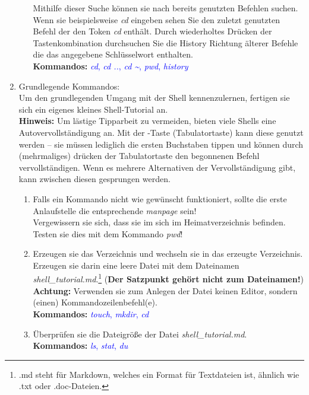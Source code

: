 \documentclass[paper=a4,fontsize=11pt]{scrartcl}%
\numberwithin{equation}{section}
\begin{document}
\begin{enumerate}
\begin{enumerate}[label=(\alph*)]
		Mithilfe dieser Suche können sie nach bereits genutzten Befehlen suchen. Wenn sie beispielsweise \emph{cd} eingeben sehen Sie den zuletzt genutzten Befehl der den Token \emph{cd} enthält. Durch wiederholtes Drücken der Tastenkombination  durchsuchen Sie die History Richtung älterer Befehle die das angegebene Schlüsselwort enthalten.\\
		\textbf{Kommandos:} \textcolor{blue}{\emph{cd}, \emph{cd ..}, \emph{cd \textasciitilde}, \emph{pwd}, \emph{history}}
	\end{enumerate}
	\item Grundlegende Kommandos:\\
  Um den grundlegenden Umgang mit der Shell kennenzulernen, fertigen sie sich ein eigenes kleines Shell-Tutorial an.\\
  \textbf{Hinweis:} Um lästige Tipparbeit zu vermeiden, bieten viele Shells eine Autovervollständigung an. Mit der \keys{\tab}-Taste (Tabulatortaste) kann diese genutzt werden -- sie müssen lediglich die ersten Buchstaben tippen und können durch (mehrmaliges) drücken der Tabulatortaste den begonnenen Befehl vervollständigen. Wenn es mehrere Alternativen der Vervollständigung gibt, kann zwischen diesen gesprungen werden.\\
  	\begin{enumerate}[label=(\alph*)]
  		\item Falls ein Kommando nicht wie gewünscht funktioniert, sollte die erste Anlaufstelle die entsprechende \emph{manpage} sein!\\
  		Vergewissern sie sich, dass sie im sich im Heimatverzeichnis befinden. Testen sie dies mit dem Kommando \emph{pwd}!
  		\item Erzeugen sie das Verzeichnis  und wechseln sie in das erzeugte Verzeichnis. Erzeugen sie darin eine leere Datei mit dem Dateinamen \textit{shell\_tutorial.md}.\footnote{.md steht für Markdown, welches ein Format für Textdateien ist, ähnlich wie .txt oder .doc-Dateien.} (\textbf{Der Satzpunkt gehört nicht zum Dateinamen!})\\
        \textbf{Achtung:} Verwenden sie zum Anlegen der Datei keinen Editor, sondern (einen) Kommandozeilenbefehl(e).\\
        \textbf{Kommandos:} \textcolor{blue}{\emph{touch}, \emph{mkdir}, \emph{cd}}
		\item Überprüfen sie die Dateigröße der Datei \textit{shell\_tutorial.md}.\\
		\textbf{Kommandos:} \textcolor{blue}{\emph{ls}, \emph{stat}, \emph{du}}

\end{enumerate}
\end{enumerate}
\end{document}
